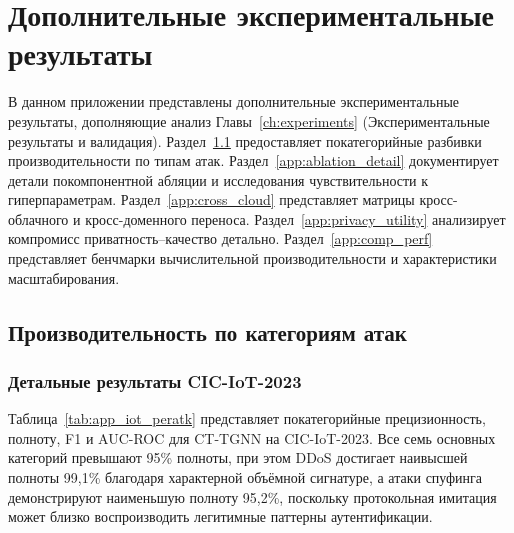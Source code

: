 
\chapter{Дополнительные экспериментальные результаты}
\label{app:extra_results}

В данном приложении представлены дополнительные экспериментальные результаты, дополняющие анализ Главы~\ref{ch:experiments} (Экспериментальные результаты и валидация). Раздел~\ref{app:per_attack} предоставляет покатегорийные разбивки производительности по типам атак. Раздел~\ref{app:ablation_detail} документирует детали покомпонентной абляции и исследования чувствительности к гиперпараметрам. Раздел~\ref{app:cross_cloud} представляет матрицы кросс-облачного и кросс-доменного переноса. Раздел~\ref{app:privacy_utility} анализирует компромисс приватность--качество детально. Раздел~\ref{app:comp_perf} представляет бенчмарки вычислительной производительности и характеристики масштабирования.


\section{Производительность по категориям атак}
\label{app:per_attack}

\subsection{Детальные результаты CIC-IoT-2023}
\label{app:cicids_iot_detail}

Таблица~\ref{tab:app_iot_peratk} представляет покатегорийные прецизионность, полноту, F1 и AUC-ROC для CT-TGNN на CIC-IoT-2023. Все семь основных категорий превышают 95\% полноты, при этом DDoS достигает наивысшей полноты 99,1\% благодаря характерной объёмной сигнатуре, а атаки спуфинга демонстрируют наименьшую полноту 95,2\%, поскольку протокольная имитация может близко воспроизводить легитимные паттерны аутентификации.

